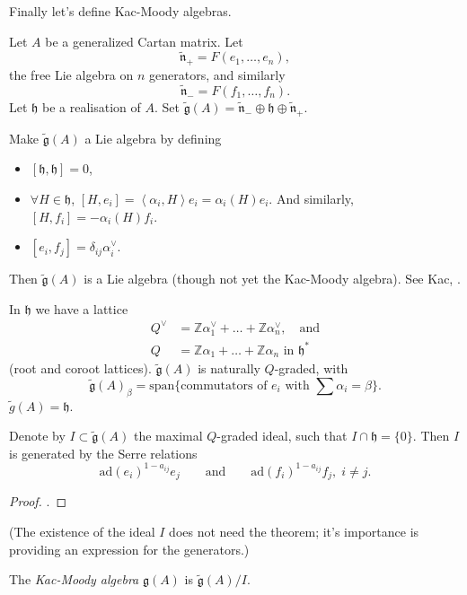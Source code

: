 \medskip\noindent
Finally let's define Kac-Moody algebras.

Let $A$ be a generalized Cartan matrix. Let 
$$
\tilde{\mathfrak{n}}_+=F(e_1,\ldots,e_n),
$$ 
the free Lie algebra on $n$ generators, and similarly
$$
\tilde{\mathfrak{n}}_-=F(f_1,\ldots,f_n).
$$
Let $\mathfrak{h}$ be a realisation of $A$. 
Set $\tilde{\mathfrak{g}}(A)
=\tilde{\mathfrak{n}}_- \oplus \mathfrak{h} \oplus \tilde{\mathfrak{n}}_+$.

Make $\tilde{\mathfrak{g}}(A)$ a Lie algebra by defining
\begin{itemize}
\item $[\mathfrak{h},\mathfrak{h}]=0$,
\item $\forall  H \in \mathfrak{h}$, $[H,e_i]=\left<\alpha_i,H\right>e_i
=\alpha_i(H)e_i$. And similarly, $[H,f_i]=-\alpha_i(H)f_i$.
\item $[e_i,f_j]=\delta_{ij}\alpha_i^\vee$.
\end{itemize}
Then $\tilde{\mathfrak{g}}(A)$ is a Lie algebra (though not yet the Kac-Moody
algebra). See Kac, \cite[Thorem 1.2]{IDLA}.

\begin{remark}
\label{remark-lattice}
In $\mathfrak{h}$ we have a lattice
\begin{align*}
Q^\vee&=\mathbb{Z}\alpha_1^\vee+\ldots+\mathbb{Z}\alpha_n^\vee,\quad
\text{and}\\
Q&=\mathbb{Z}\alpha_1+\ldots+\mathbb{Z}\alpha_n\text{ in }\mathfrak{h}^*
\end{align*}
(root and coroot lattices). $\tilde{\mathfrak{g}}(A)$ is naturally $Q$-graded,
with 
$$
\tilde{\mathfrak{g}}(A)_\beta=\text{span}\{
\text{commutators of $e_i$ with $\sum \alpha_i=\beta$}\}.
$$
$\tilde{g}(A)=\mathfrak{h}$.

\begin{theorem}
\label{theorem-Gabber-Kac}
Denote by $I \subset \tilde{\mathfrak{g}}(A)$ the maximal $Q$-graded ideal, such
that $I \cap\mathfrak{h}=\{0\}$. 
Then $I$ is generated by the Serre relations 
$$
\text{ad}(e_i)^{1-a_{ij}}e_j\qquad \text{and}\qquad 
\text{ad}(f_i)^{1-a_{ij}}f_j,\; i\neq j.
$$
\end{theorem}

\begin{proof}
\cite[Theorem 9.11]{IDLA}.
\end{proof}

(The existence of the ideal $I$ does not need the theorem; 
it's importance is providing an
expression for the generators.)

\begin{definition}
\label{definition-Kac-Moody-algebra}
The {\it Kac-Moody algebra} $\mathfrak{g}(A)$ is $\tilde{\mathfrak{g}}(A)/I$.
\end{definition}

\end{remark}


